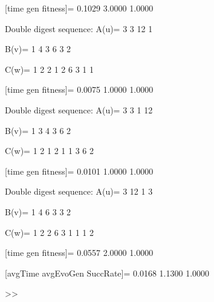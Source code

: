 [time gen fitness]=
    0.1029    3.0000    1.0000

Double digest sequence:
A(u)=
     3     3    12     1

B(v)=
     1     4     3     6     3     2

C(w)=
     1     2     2     1     2     6     3     1     1

[time gen fitness]=
    0.0075    1.0000    1.0000

Double digest sequence:
A(u)=
     3     3     1    12

B(v)=
     1     3     4     3     6     2

C(w)=
     1     2     1     2     1     1     3     6     2

[time gen fitness]=
    0.0101    1.0000    1.0000

Double digest sequence:
A(u)=
     3    12     1     3

B(v)=
     1     4     6     3     3     2

C(w)=
     1     2     2     6     3     1     1     1     2

[time gen fitness]=
    0.0557    2.0000    1.0000

[avgTime  avgEvoGen  SuccRate]=
    0.0168    1.1300    1.0000

>> 